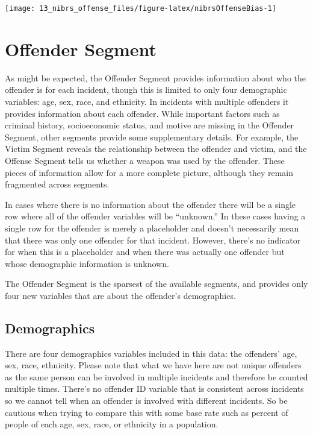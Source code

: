 \documentclass[
]{krantz}
\let\origfigure\figure
\let\endorigfigure\endfigure
\renewenvironment{figure}[1][2] {
    \expandafter\origfigure\expandafter[H]
} {
    \endorigfigure
}
\begin{document}
\begin{figure}

{\centering \texttt{[image: 13\_nibrs\_offense\_files/figure-latex/nibrsOffenseBias-1]} 

}

\caption{The annual percent of offenses reported as having a bias motivation (i.e. hate crime), 1993-2022.}\label{fig:nibrsOffenseBias}
\end{figure}

\chapter{Offender Segment}\label{offender-segment-1}

As might be expected, the Offender Segment provides
information about who the offender is for each incident,
though this is limited to only four demographic variables:
age, sex, race, and ethnicity. In incidents with multiple
offenders it provides information about each offender. While
important factors such as criminal history, socioeconomic
status, and motive are missing in the Offender Segment,
other segments provide some supplementary details. For
example, the Victim Segment reveals the relationship between
the offender and victim, and the Offense Segment tells us
whether a weapon was used by the offender. These pieces of
information allow for a more complete picture, although they
remain fragmented across segments.

In cases where there is no information about the offender
there will be a single row where all of the offender
variables will be ``unknown.'' In these cases having a
single row for the offender is merely a placeholder and
doesn't necessarily mean that there was only one offender
for that incident. However, there's no indicator for when
this is a placeholder and when there was actually one
offender but whose demographic information is unknown.

The Offender Segment is the sparsest of the available
segments, and provides only four new variables that are
about the offender's demographics.

\section{Demographics}\label{demographics-1}

There are four demographics variables included in this data:
the offenders' age, sex, race, ethnicity. Please note that
what we have here are not unique offenders as the same
person can be involved in multiple incidents and therefore
be counted multiple times. There's no offender ID variable
that is consistent across incidents so we cannot tell when
an offender is involved with different incidents. So be
cautious when trying to compare this with some base rate
such as percent of people of each age, sex, race, or
ethnicity in a population.
\end{document}
